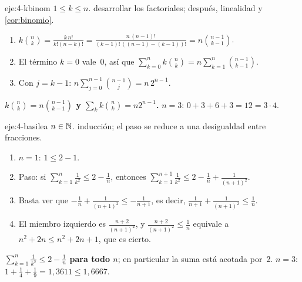 \begin{solucion}{eje:4-kbinom}
\datos $1\le k\le n$.
\planteamiento desarrollar los factoriales; después, linealidad y \cref{cor:binomio}.
\pasos
\begin{enumerate}[label=\arabic*.]
  \item $k\binom nk=\frac{k\,n!}{k!(n-k)!}=\frac{n\,(n-1)!}{(k-1)!\,((n-1)-(k-1))!}=n\binom{n-1}{k-1}$.
  \item El término $k=0$ vale~0, así que $\sum_{k=0}^nk\binom nk=n\sum_{k=1}^n\binom{n-1}{k-1}$.
  \item Con $j=k-1$: $n\sum_{j=0}^{n-1}\binom{n-1}j=n\,2^{n-1}$.
\end{enumerate}
\resultado \textbf{$k\binom nk=n\binom{n-1}{k-1}$ y $\sum_kk\binom nk=n2^{n-1}$.}
\comprobacion $n=3$: $0+3+6+3=12=3\cdot4$.
\end{solucion}

\begin{solucion}{eje:4-basilea}
\datos $n\in\mathbb{N}$.
\planteamiento inducción; el paso se reduce a una desigualdad entre fracciones.
\pasos
\begin{enumerate}[label=\arabic*.]
  \item $n=1$: $1\le2-1$.
  \item Paso: si $\sum_{k=1}^n\frac1{k^2}\le2-\frac1n$, entonces $\sum_{k=1}^{n+1}\frac1{k^2}\le2-\frac1n+\frac1{(n+1)^2}$.
  \item Basta ver que $-\frac1n+\frac1{(n+1)^2}\le-\frac1{n+1}$, es decir, $\frac1{n+1}+\frac1{(n+1)^2}\le\frac1n$.
  \item El miembro izquierdo es $\frac{n+2}{(n+1)^2}$, y $\frac{n+2}{(n+1)^2}\le\frac1n$ equivale a $n^2+2n\le n^2+2n+1$, que es cierto.
\end{enumerate}
\resultado \textbf{$\sum_{k=1}^n\frac1{k^2}\le2-\frac1n$ para todo $n$}; en particular la suma está acotada por~2.
\comprobacion $n=3$: $1+\frac14+\frac19=1{,}3611\le1{,}6667$.
\end{solucion}

